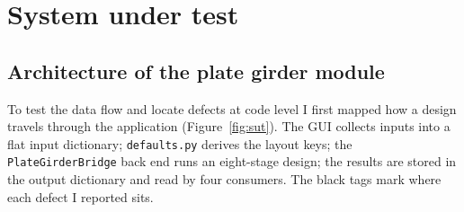 \documentclass[11pt,a4paper]{article}
\newcommand{\src}[1]{\texttt{#1}}
\begin{document}
\section{System under test}\label{sec:sut}
\subsection{Architecture of the plate girder module}
To test the data flow and locate defects at code level I first mapped how a design travels through the application
(Figure~\ref{fig:sut}). The GUI collects inputs into a flat input dictionary; \src{defaults.py} derives the layout keys; the
\src{PlateGirderBridge} back end runs an eight-stage design; the results are stored in the output dictionary and read by four
consumers. The black tags mark where each defect I reported sits.
\end{document}
